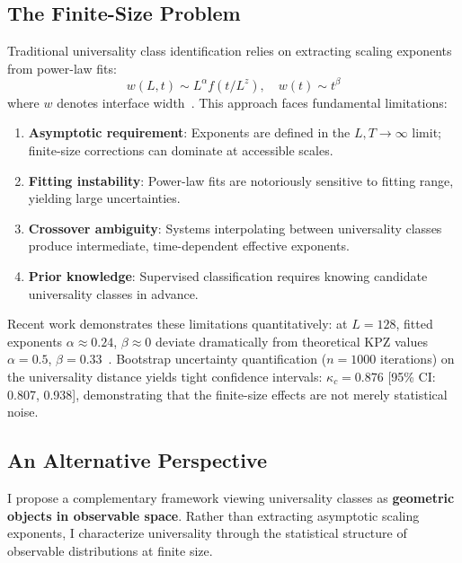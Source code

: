 \documentclass[aps,pre,reprint,amsmath,amssymb,superscriptaddress]{revtex4-2}
\begin{document}
\subsection{The Finite-Size Problem}

Traditional universality class identification relies on extracting scaling exponents from power-law fits:
\begin{equation}
w(L,t) \sim L^\alpha f(t/L^z), \quad w(t) \sim t^\beta
\end{equation}
where $w$ denotes interface width~\cite{FamilyVicsek1985}. This approach faces fundamental limitations:

\begin{enumerate}
\item \textbf{Asymptotic requirement}: Exponents are defined in the $L,T \to \infty$ limit; finite-size corrections can dominate at accessible scales.
\item \textbf{Fitting instability}: Power-law fits are notoriously sensitive to fitting range, yielding large uncertainties.
\item \textbf{Crossover ambiguity}: Systems interpolating between universality classes produce intermediate, time-dependent effective exponents.
\item \textbf{Prior knowledge}: Supervised classification requires knowing candidate universality classes in advance.
\end{enumerate}

Recent work demonstrates these limitations quantitatively: at $L = 128$, fitted exponents $\alpha \approx 0.24$, $\beta \approx 0$ deviate dramatically from theoretical KPZ values $\alpha = 0.5$, $\beta = 0.33$~\cite{Bentley2026}. Bootstrap uncertainty quantification ($n=1000$ iterations) on the universality distance yields tight confidence intervals: $\kappa_c = 0.876$ [95\% CI: 0.807, 0.938], demonstrating that the finite-size effects are not merely statistical noise.

\subsection{An Alternative Perspective}

I propose a complementary framework viewing universality classes as \textbf{geometric objects in observable space}. Rather than extracting asymptotic scaling exponents, I characterize universality through the statistical structure of observable distributions at finite size.
\end{document}

